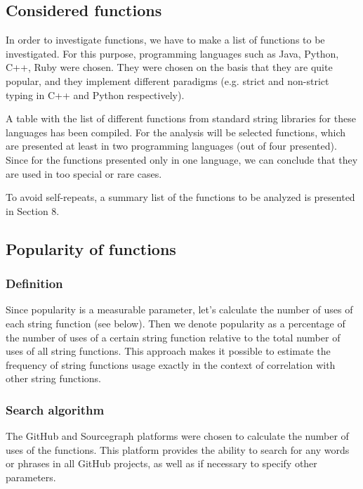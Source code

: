 \documentclass[anonymous,sigplan,review,11pt,nonacm,natbib=false]{acmart}
\begin{document}
    \subsection{Considered functions}

    In order to investigate functions, we have to make a list of functions to be investigated. For this purpose, programming languages such as Java, Python, C++, Ruby were chosen. They were chosen on the basis that they are quite popular, and they implement different paradigms (e.g. strict and non-strict typing in C++ and Python respectively).

    A table with the list of different functions from standard string libraries for these languages has been compiled. For the analysis will be selected functions, which are presented at least in two programming languages (out of four presented). Since for the functions presented only in one language, we can conclude that they are used in too special or rare cases.

    To avoid self-repeats, a summary list of the functions to be analyzed is presented in Section 8.

    \subsection{Popularity of functions}

    \subsubsection{Definition}

    Since popularity is a measurable parameter, let's calculate the number of uses of each string function (see below). Then we denote popularity as a percentage of the number of uses of a certain string function relative to the total number of uses of all string functions. This approach makes it possible to estimate the frequency of string functions usage exactly in the context of correlation with other string functions.

    \subsubsection{Search algorithm}

    The GitHub and Sourcegraph platforms were chosen to calculate the number of uses of the functions. This platform provides the ability to search for any words or phrases in all GitHub projects, as well as if necessary to specify other parameters.
\end{document}
